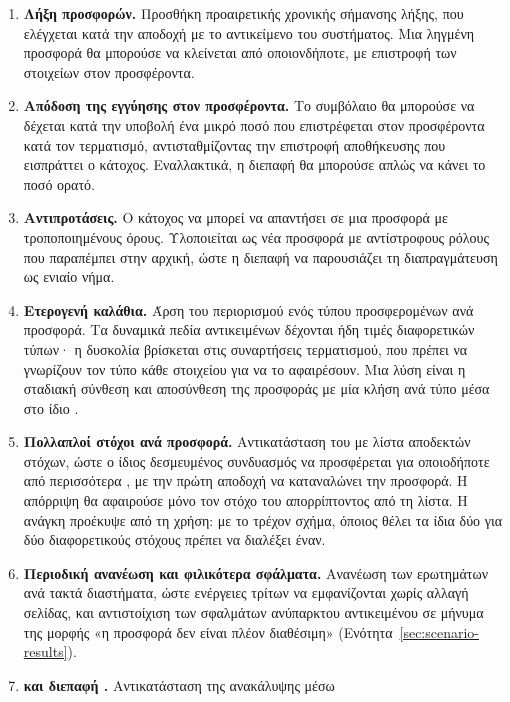 \begin{enumerate}
  \item \textbf{Λήξη προσφορών.} Προσθήκη προαιρετικής χρονικής σήμανσης λήξης, που
        ελέγχεται κατά την αποδοχή με το αντικείμενο  του συστήματος. Μια
        ληγμένη προσφορά θα μπορούσε να κλείνεται από οποιονδήποτε, με επιστροφή των
        στοιχείων στον προσφέροντα.
  \item \textbf{Απόδοση της εγγύησης στον προσφέροντα.} Το συμβόλαιο θα μπορούσε να
        δέχεται κατά την υποβολή ένα μικρό ποσό που επιστρέφεται στον προσφέροντα κατά τον
        τερματισμό, αντισταθμίζοντας την επιστροφή αποθήκευσης που εισπράττει ο κάτοχος.
        Εναλλακτικά, η διεπαφή θα μπορούσε απλώς να κάνει το ποσό ορατό.
  \item \textbf{Αντιπροτάσεις.} Ο κάτοχος να μπορεί να απαντήσει σε μια προσφορά με
        τροποποιημένους όρους. Υλοποιείται ως νέα προσφορά με αντίστροφους ρόλους που
        παραπέμπει στην αρχική, ώστε η διεπαφή να παρουσιάζει τη διαπραγμάτευση ως ενιαίο
        νήμα.
  \item \textbf{Ετερογενή καλάθια.} Άρση του περιορισμού ενός τύπου προσφερομένων ανά
        προσφορά. Τα δυναμικά πεδία αντικειμένων δέχονται ήδη τιμές διαφορετικών τύπων· η
        δυσκολία βρίσκεται στις συναρτήσεις τερματισμού, που πρέπει να γνωρίζουν τον τύπο
        κάθε στοιχείου για να το αφαιρέσουν. Μια λύση είναι η σταδιακή σύνθεση και
        αποσύνθεση της προσφοράς με μία κλήση ανά τύπο μέσα στο ίδιο .
  \item \textbf{Πολλαπλοί στόχοι ανά προσφορά.} Αντικατάσταση του 
        με λίστα αποδεκτών στόχων, ώστε ο ίδιος δεσμευμένος συνδυασμός να προσφέρεται για
        οποιοδήποτε από περισσότερα , με την πρώτη αποδοχή να καταναλώνει την
        προσφορά. Η απόρριψη θα αφαιρούσε μόνο τον στόχο του απορρίπτοντος από τη λίστα.
        Η ανάγκη προέκυψε από τη χρήση: με το τρέχον σχήμα, όποιος θέλει τα ίδια δύο
         για δύο διαφορετικούς στόχους πρέπει να διαλέξει έναν.
  \item \textbf{Περιοδική ανανέωση και φιλικότερα σφάλματα.} Ανανέωση των ερωτημάτων
        ανά τακτά διαστήματα, ώστε ενέργειες τρίτων να εμφανίζονται χωρίς αλλαγή σελίδας, και
        αντιστοίχιση των σφαλμάτων ανύπαρκτου αντικειμένου σε μήνυμα της μορφής «η προσφορά
        δεν είναι πλέον διαθέσιμη» (Ενότητα~\ref{sec:scenario-results}).
  \item \textbf{ και διεπαφή .} Αντικατάσταση της ανακάλυψης μέσω

\end{enumerate}
